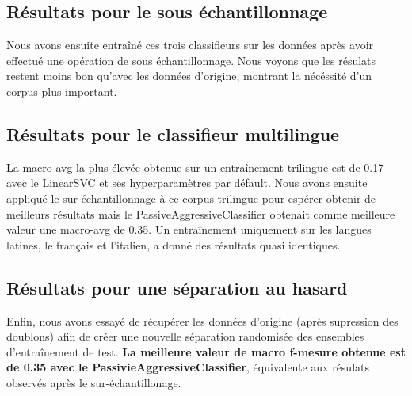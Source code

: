 \documentclass[11pt]{article}
\begin{document}
\subsection{Résultats pour le sous échantillonnage}
Nous avons ensuite entraîné ces trois classifieurs sur les données après avoir effectué une opération de sous échantillonnage. Nous voyons que les résulats restent moins bon qu'avec les données d'origine, montrant la nécéssité d'un corpus plus important. 

\begin{table}[ht]
\centering
{}
\caption{Meilleurs résultats obtenus après sous échantillonnage.}

\label{tab:pourcentage_test}
\end{table}


\subsection{Résultats pour le classifieur multilingue}

La macro-avg la plus élevée obtenue sur un entraînement trilingue est de 0.17 avec le LinearSVC et ses hyperparamètres par défault. Nous avons ensuite appliqué le sur-échantillonnage à ce corpus trilingue pour espérer obtenir de meilleurs résultats mais le PassiveAggressiveClassifier obtenait comme meilleure valeur une macro-avg de 0.35. Un entraînement uniquement sur les langues latines, le français et l'italien, a donné des résultats quasi identiques.

\subsection{Résultats pour une séparation au hasard}

Enfin, nous avons essayé de récupérer les données d'origine (après supression des doublons) afin de créer une nouvelle séparation randomisée des ensembles d'entraînement de test.
\textbf{La meilleure valeur de macro f-mesure obtenue est de 0.35 avec le PassivieAggressiveClassifier}, équivalente aux résulats observés après le sur-échantillonage. 
\end{document}
